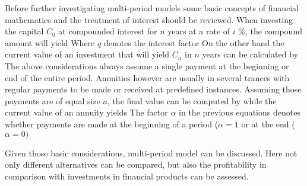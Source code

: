         Before further investigating multi-period models some basic concepts of financial mathematics
        and the treatment of interest should be reviewed. When investing the capital $C_0$ at compounded
        interest for $n$ years at a rate of $i$ \%, the compound amount will yield
        Where $q$ denotes the interest factor
        On the other hand the current value of an investment that will yield $C_n$ in $n$ years can be calculated
        by
        The above considerations always assume a single payment at the beginning or end of the entire period.
        Annuities however are usually in several trances with regular payments to be made or received at
        predefined instances. Assuming those payments are of equal size $a$, the final value can be computed by
        while the current value of an annuity yields
        The factor $\alpha$ in the previous equations denotes whether payments are made at the beginning
        of a period ($\alpha = 1$ or at the end ($\alpha = 0)$

        Given those basic considerations, multi-period model can be discussed. Here not only different alternatives can be compared,
        but also the profitability in comparison with investments in financial products can be assessed.

